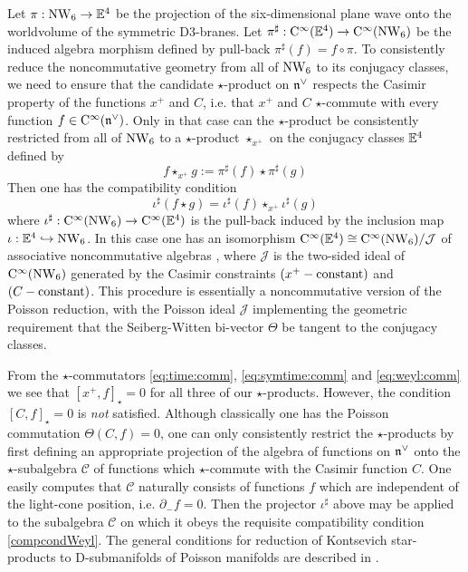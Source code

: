Let $\pi:\operatorname{NW}_6\to{\mathbb E}^4$ be the projection of the six-dimensional plane wave
onto the worldvolume of the symmetric D3-branes. Let
$\pi^\sharp:{\rm C}^\infty({\mathbb E}^4)\to{\rm C}^\infty(\operatorname{NW}_6)$ be the induced algebra
morphism defined by pull-back $\pi^\sharp(f)=f\circ\pi$. To consistently reduce
the noncommutative geometry from all of $\operatorname{NW}_6$ to its conjugacy classes, we
need to ensure that the candidate $\star$-product on ${\mathfrak n}^\vee$ respects the Casimir
property of the functions $x^+$ and $C$, i.e. that $x^+$ and $C$ $\star$-commute
with every function $f\in{\rm C}^\infty({\mathfrak n}^\vee)$. Only in that case can the
$\star$-product be consistently restricted from all of $\operatorname{NW}_6$ to a $\star$-product
$\star_{x^+}$ on the conjugacy classes ${\mathbb E}^4$ defined by
\begin{equation}
  \label{starxpdef}
  f\star_{x^+}g:=\pi^\sharp(f)\star\pi^\sharp(g)  
\end{equation}
Then one has the compatibility condition
\begin{equation}
  \label{compcondWeyl}
  \iota^\sharp(f\star g)=\iota^\sharp(f)\star_{x^+}\iota^\sharp(g)
\end{equation}
where $\iota^\sharp:{\rm C}^\infty(\operatorname{NW}_6)\to{\rm C}^\infty({\mathbb E}^4)$ is the pull-back
induced by the inclusion map $\iota:{\mathbb E}^4\hookrightarrow\operatorname{NW}_6$. In this case one
has an isomorphism ${\rm C}^\infty({\mathbb E}^4)\cong{\rm C}^\infty(\operatorname{NW}_6)/\mathcal{J}$ of
associative noncommutative algebras \cite{Waldmann1}, where $\mathcal{J}$ is the
two-sided ideal of ${\rm C}^\infty(\operatorname{NW}_6)$ generated by the Casimir constraints
$(x^+-{\rm constant})$ and $(C-{\rm constant})$. This procedure is essentially a
noncommutative version of the Poisson reduction, with the Poisson ideal
$\mathcal{J}$ implementing the geometric requirement that the Seiberg-Witten
bi-vector $\Theta$ be tangent to the conjugacy classes.

From the $\star$-commutators \eqref{eq:time:comm}, \eqref{eq:symtime:comm} and
\eqref{eq:weyl:comm} we see that $[x^+,f]_\star=0$ for all three of our
$\star$-products. However, the condition $[C,f]_\star=0$ is {\it not} satisfied.
Although classically one has the Poisson commutation $\Theta(C,f)=0$, one can
only consistently restrict the $\star$-products by first defining an appropriate
projection of the algebra of functions on ${\mathfrak n}^\vee$ onto the
$\star$-subalgebra $\mathcal{C}$ of functions which $\star$-commute with the
Casimir function $C$. One easily computes that $\mathcal{C}$ naturally consists
of functions $f$ which are independent of the light-cone position, i.e.
$\partial_-f=0$. Then the projector $\iota^\sharp$ above may be applied to the
subalgebra $\mathcal{C}$ on which it obeys the requisite compatibility condition
\eqref{compcondWeyl}. The general conditions for reduction of Kontsevich
star-products to D-submanifolds of Poisson manifolds are described
in \cite{CattFel2,CFal1}.

